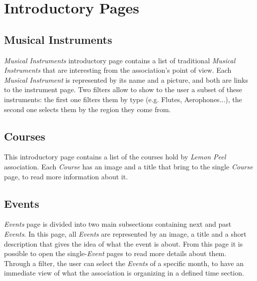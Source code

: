 \documentclass[../../DD.tex]{subfiles}
\begin{document}
\newpage
\section{Introductory Pages \label{sect:2.1}}
	\subsection{Musical Instruments}
		\textit{Musical Instruments} introductory page contains a list of traditional \textit{Musical Instruments} that are interesting from the association's point of view. Each \textit{Musical Instrument} is represented by its name and a picture, and both are links to the instrument page. Two filters allow to show to the user a subset of these instruments: the first one filters them by type (e.g. Flutes, Aerophones...), the second one selects them by the region they come from.
		\newline

	\newpage
	\subsection{Courses}
		This introductory page contains a list of the courses hold by \textit{Lemon Peel} association. Each \textit{Course} has an image and a title that bring to the single \textit{Course} page, to read more information about it.
		\newline

	\newpage
	\subsection{Events}
		\textit{Events} page is divided into two main subsections containing next and past \textit{Events}. In this page, all \textit{Events} are represented by an image, a title and a short description that gives the idea of what the event is about. From this page it is possible to open the single-\textit{Event} pages to read more details about them. Through a filter, the user can select the \textit{Events} of a specific month, to have an immediate view of what the association is organizing in a defined time section.
		\newline
\end{document}
